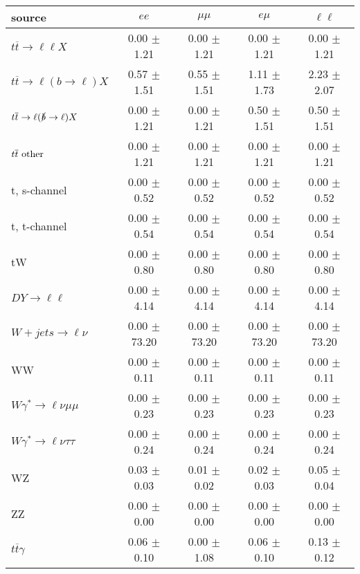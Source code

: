 \begin{tabular}{l|cccc} \hline\hline
source & $ee$ & $\mu\mu$ & $e\mu$ & $\ell\ell $ \\
\hline
$t\overline{t} \rightarrow \ell \ell X$ &  0.00 $\pm$  1.21 &  0.00 $\pm$  1.21 &  0.00 $\pm$  1.21 &  0.00 $\pm$  1.21 \\
$t\overline{t} \rightarrow \ell (b \rightarrow \ell) X$ &  0.57 $\pm$  1.51 &  0.55 $\pm$  1.51 &  1.11 $\pm$  1.73 &  2.23 $\pm$  2.07 \\
$t\overline{t} \rightarrow \ell (\slashed b \rightarrow \ell) X$ &  0.00 $\pm$  1.21 &  0.00 $\pm$  1.21 &  0.50 $\pm$  1.51 &  0.50 $\pm$  1.51 \\
        $t\overline{t}\ \rm{other}$ &  0.00 $\pm$  1.21 &  0.00 $\pm$  1.21 &  0.00 $\pm$  1.21 &  0.00 $\pm$  1.21 \\
\hline
                       t, s-channel &  0.00 $\pm$  0.52 &  0.00 $\pm$  0.52 &  0.00 $\pm$  0.52 &  0.00 $\pm$  0.52 \\
                       t, t-channel &  0.00 $\pm$  0.54 &  0.00 $\pm$  0.54 &  0.00 $\pm$  0.54 &  0.00 $\pm$  0.54 \\
                                 tW &  0.00 $\pm$  0.80 &  0.00 $\pm$  0.80 &  0.00 $\pm$  0.80 &  0.00 $\pm$  0.80 \\
\hline
         $DY \rightarrow \ell \ell$ &  0.00 $\pm$  4.14 &  0.00 $\pm$  4.14 &  0.00 $\pm$  4.14 &  0.00 $\pm$  4.14 \\
      $W+jets \rightarrow \ell \nu$ &  0.00 $\pm$ 73.20 &  0.00 $\pm$ 73.20 &  0.00 $\pm$ 73.20 &  0.00 $\pm$ 73.20 \\
                                 WW &  0.00 $\pm$  0.11 &  0.00 $\pm$  0.11 &  0.00 $\pm$  0.11 &  0.00 $\pm$  0.11 \\
\hline
$W\gamma^{*} \rightarrow \ell \nu \mu\mu$ &  0.00 $\pm$  0.23 &  0.00 $\pm$  0.23 &  0.00 $\pm$  0.23 &  0.00 $\pm$  0.23 \\
$W\gamma^{*} \rightarrow \ell \nu \tau\tau$ &  0.00 $\pm$  0.24 &  0.00 $\pm$  0.24 &  0.00 $\pm$  0.24 &  0.00 $\pm$  0.24 \\
                                 WZ &  0.03 $\pm$  0.03 &  0.01 $\pm$  0.02 &  0.02 $\pm$  0.03 &  0.05 $\pm$  0.04 \\
                                 ZZ &  0.00 $\pm$  0.00 &  0.00 $\pm$  0.00 &  0.00 $\pm$  0.00 &  0.00 $\pm$  0.00 \\
\hline
              $t\overline{t}\gamma$ &  0.06 $\pm$  0.10 &  0.00 $\pm$  1.08 &  0.06 $\pm$  0.10 &  0.13 $\pm$  0.12 \\

\end{tabular}
